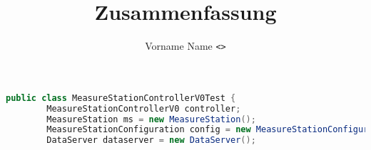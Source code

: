 \documentclass[header, margin=big]{../hsrzf}
\date{\thesemester}
\title{\textsl{\themodule} Zusammenfassung}
\author{Vorname Name \texttt{<\theauthoremail>}}
\begin{document}
\maketitle

\blinddocument

\begin{lstlisting}[language=java]
public class MeasureStationControllerV0Test {
        MeasureStationControllerV0 controller;
        MeasureStation ms = new MeasureStation();
        MeasureStationConfiguration config = new MeasureStationConfiguration();
        DataServer dataserver = new DataServer();
\end{lstlisting}
\end{document}
